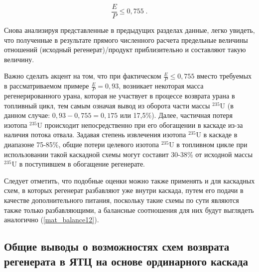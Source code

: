 
\begin{equation}
  \label{eq_232_balance_X_}
    \frac{E}{P} \leq 0,755 \; .
\end{equation}

Снова анализируя представленные в предыдущих разделах данные, легко увидеть, что полученные в результате прямого численного расчета предельные величины отношений (исходный регенерат)/продукт приблизительно и составляют такую величину.

Важно сделать акцент на том, что при фактическом $\frac{E}{P}\leq 0,755$ вместо требуемых в рассматриваемом примере $\frac{E}{P}=0,93$, возникает некоторая масса регенерированного урана, которая не участвует в процессе возврата урана в топливный цикл, тем самым означая вывод из оборота части массы $^{235}$U (в данном случае: $0,93-0,755=0,175$ или 17,5\%). Далее, частичная потеря изотопа $^{235}$U происходит непосредственно при его обогащении в каскаде из-за наличия потока отвала. Задавая степень извлечения изотопа $^{235}$U в каскаде в диапазоне 75-85\%, общие потери целевого изотопа $^{235}$U в топливном цикле при использовании такой каскадной схемы могут составит 30-38\% от исходной массы $^{235}$U в поступившем в обогащение регенерате.

Следует отметить, что подобные оценки можно также применять и для каскадных схем, в которых регенерат разбавляют уже внутри каскада, путем его подачи в качестве дополнительного питания, поскольку такие схемы по сути являются также только разбавляющими, а балансные соотношения для них будут выглядеть аналогично (\ref{mat_balance12}).

\subsection{Общие выводы о возможностях схем возврата регенерата в ЯТЦ на основе ординарного каскада}


